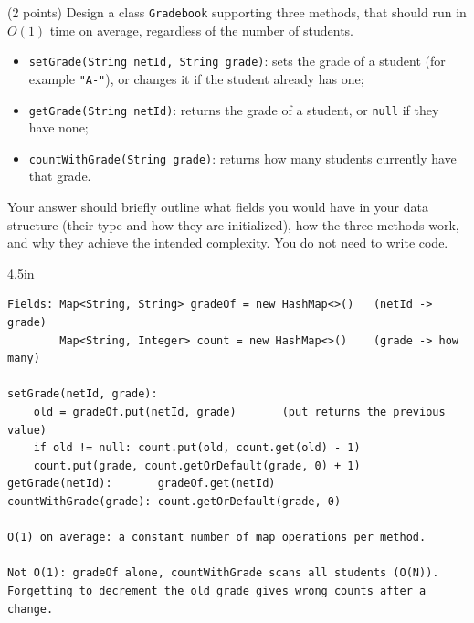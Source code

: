 \begin{question}
(2 points) Design a class \lstinline|Gradebook| supporting three methods, that should run in $O(1)$ time on average, regardless of the number of students.
\begin{itemize}[leftmargin=2em,itemsep=1pt,topsep=2pt]
\item \lstinline|setGrade(String netId, String grade)|: sets the grade of a student (for example \lstinline|"A-"|), or changes it if the student already has one;
\item \lstinline|getGrade(String netId)|: returns the grade of a student, or \lstinline|null| if they have none;
\item \lstinline|countWithGrade(String grade)|: returns how many students currently have that grade.
\end{itemize}

Your answer should briefly outline what fields you would have in your data structure (their type and how they are initialized), how the three methods work, and why they achieve the intended complexity. You do not need to write code.

\begin{answerspace}{4.5in}
\ifanswers
\begin{verbatim}
Fields: Map<String, String> gradeOf = new HashMap<>()   (netId -> grade)
        Map<String, Integer> count = new HashMap<>()    (grade -> how many)

setGrade(netId, grade):
    old = gradeOf.put(netId, grade)       (put returns the previous value)
    if old != null: count.put(old, count.get(old) - 1)
    count.put(grade, count.getOrDefault(grade, 0) + 1)
getGrade(netId):       gradeOf.get(netId)
countWithGrade(grade): count.getOrDefault(grade, 0)

O(1) on average: a constant number of map operations per method.

Not O(1): gradeOf alone, countWithGrade scans all students (O(N)).
Forgetting to decrement the old grade gives wrong counts after a change.
\end{verbatim}
\fi
\end{answerspace}
\end{question}
